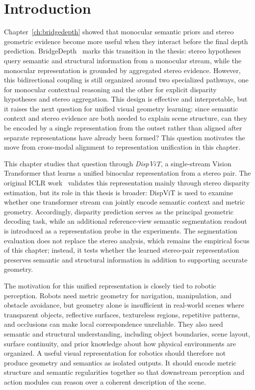 
\section{Introduction}
Chapter~\ref{ch:bridgedepth} showed that monocular semantic priors and stereo geometric evidence become more useful when they interact before the final depth prediction.
BridgeDepth~\cite{guan2025bridgedepth} marks this transition in the thesis: stereo hypotheses query semantic and structural information from a monocular stream, while the monocular representation is grounded by aggregated stereo evidence.
However, this bidirectional coupling is still organized around two specialized pathways, one for monocular contextual reasoning and the other for explicit disparity hypotheses and stereo aggregation.
This design is effective and interpretable, but it raises the next question for unified visual geometry learning: since semantic context and stereo evidence are both needed to explain scene structure, can they be encoded by a single representation from the outset rather than aligned after separate representations have already been formed?
This question motivates the move from cross-modal alignment to representation unification in this chapter.

This chapter studies that question through \emph{DispViT}, a single-stream Vision Transformer that learns a unified binocular representation from a stereo pair.
The original ICLR work~\cite{guan2026dispvit} validates this representation mainly through stereo disparity estimation, but its role in this thesis is broader: DispViT is used to examine whether one transformer stream can jointly encode semantic context and metric geometry.
Accordingly, disparity prediction serves as the principal geometric decoding task, while an additional reference-view semantic segmentation readout is introduced as a representation probe in the experiments.
The segmentation evaluation does not replace the stereo analysis, which remains the empirical focus of this chapter; instead, it tests whether the learned stereo-pair representation preserves semantic and structural information in addition to supporting accurate geometry.

The motivation for this unified representation is closely tied to robotic perception.
Robots need metric geometry for navigation, manipulation, and obstacle avoidance, but geometry alone is insufficient in real-world scenes where transparent objects, reflective surfaces, textureless regions, repetitive patterns, and occlusions can make local correspondence unreliable.
They also need semantic and structural understanding, including object boundaries, scene layout, surface continuity, and prior knowledge about how physical environments are organized.
A useful visual representation for robotics should therefore not produce geometry and semantics as isolated outputs.
It should encode metric structure and semantic regularities together so that downstream perception and action modules can reason over a coherent description of the scene.


